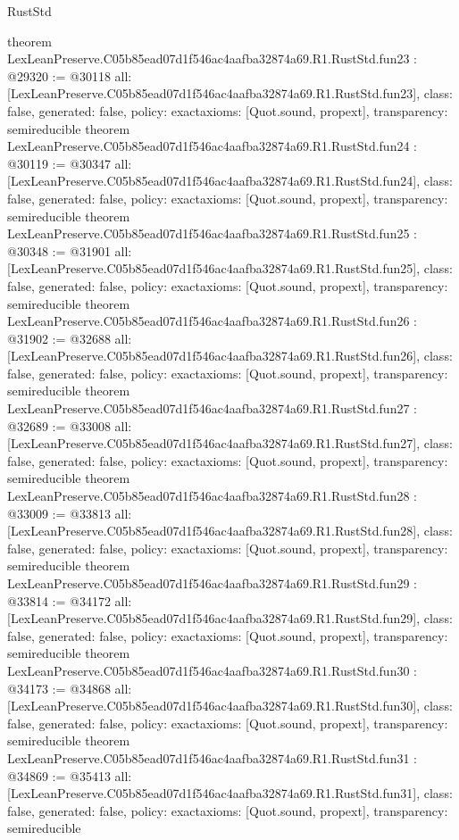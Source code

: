 \begin{lexlean}{RustStd}
\begin{coremodule}
{}
theorem LexLeanPreserve.C05b85ead07d1f546ac4aafba32874a69.R1.RustStd.fun23 : @29320 := @30118 {
  all: [LexLeanPreserve.C05b85ead07d1f546ac4aafba32874a69.R1.RustStd.fun23],
  class: false,
  generated: false,
  policy: exact{axioms: [Quot.sound, propext]},
  transparency: semireducible
}
theorem LexLeanPreserve.C05b85ead07d1f546ac4aafba32874a69.R1.RustStd.fun24 : @30119 := @30347 {
  all: [LexLeanPreserve.C05b85ead07d1f546ac4aafba32874a69.R1.RustStd.fun24],
  class: false,
  generated: false,
  policy: exact{axioms: [Quot.sound, propext]},
  transparency: semireducible
}
theorem LexLeanPreserve.C05b85ead07d1f546ac4aafba32874a69.R1.RustStd.fun25 : @30348 := @31901 {
  all: [LexLeanPreserve.C05b85ead07d1f546ac4aafba32874a69.R1.RustStd.fun25],
  class: false,
  generated: false,
  policy: exact{axioms: [Quot.sound, propext]},
  transparency: semireducible
}
theorem LexLeanPreserve.C05b85ead07d1f546ac4aafba32874a69.R1.RustStd.fun26 : @31902 := @32688 {
  all: [LexLeanPreserve.C05b85ead07d1f546ac4aafba32874a69.R1.RustStd.fun26],
  class: false,
  generated: false,
  policy: exact{axioms: [Quot.sound, propext]},
  transparency: semireducible
}
theorem LexLeanPreserve.C05b85ead07d1f546ac4aafba32874a69.R1.RustStd.fun27 : @32689 := @33008 {
  all: [LexLeanPreserve.C05b85ead07d1f546ac4aafba32874a69.R1.RustStd.fun27],
  class: false,
  generated: false,
  policy: exact{axioms: [Quot.sound, propext]},
  transparency: semireducible
}
theorem LexLeanPreserve.C05b85ead07d1f546ac4aafba32874a69.R1.RustStd.fun28 : @33009 := @33813 {
  all: [LexLeanPreserve.C05b85ead07d1f546ac4aafba32874a69.R1.RustStd.fun28],
  class: false,
  generated: false,
  policy: exact{axioms: [Quot.sound, propext]},
  transparency: semireducible
}
theorem LexLeanPreserve.C05b85ead07d1f546ac4aafba32874a69.R1.RustStd.fun29 : @33814 := @34172 {
  all: [LexLeanPreserve.C05b85ead07d1f546ac4aafba32874a69.R1.RustStd.fun29],
  class: false,
  generated: false,
  policy: exact{axioms: [Quot.sound, propext]},
  transparency: semireducible
}
theorem LexLeanPreserve.C05b85ead07d1f546ac4aafba32874a69.R1.RustStd.fun30 : @34173 := @34868 {
  all: [LexLeanPreserve.C05b85ead07d1f546ac4aafba32874a69.R1.RustStd.fun30],
  class: false,
  generated: false,
  policy: exact{axioms: [Quot.sound, propext]},
  transparency: semireducible
}
theorem LexLeanPreserve.C05b85ead07d1f546ac4aafba32874a69.R1.RustStd.fun31 : @34869 := @35413 {
  all: [LexLeanPreserve.C05b85ead07d1f546ac4aafba32874a69.R1.RustStd.fun31],
  class: false,
  generated: false,
  policy: exact{axioms: [Quot.sound, propext]},
  transparency: semireducible
}
\end{coremodule}
\end{lexlean}
